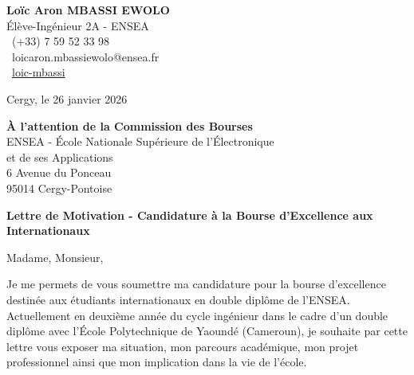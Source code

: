 \documentclass[a4paper,11pt]{article}
\begin{document}
\begin{flushleft}
\textbf{Loïc Aron MBASSI EWOLO} \\
Élève-Ingénieur 2A - ENSEA \\
\faPhone\ (+33) 7 59 52 33 98 \\
\faEnvelope\ loicaron.mbassiewolo@ensea.fr \\
\faLinkedin\ \href{https://www.linkedin.com/in/loic-aron-mbassi-ewolo-3942a9246/}{loic-mbassi} \\
\end{flushleft}

\vspace{0.5cm}

\begin{flushright}
Cergy, le 26 janvier 2026
\end{flushright}

\vspace{0.5cm}

\begin{flushleft}
\textbf{À l'attention de la Commission des Bourses} \\
ENSEA - École Nationale Supérieure de l'Électronique \\
et de ses Applications \\
6 Avenue du Ponceau \\
95014 Cergy-Pontoise
\end{flushleft}

\vspace{0.8cm}

\begin{center}
\textbf{\large Lettre de Motivation - Candidature à la Bourse d'Excellence aux Internationaux}
\end{center}

\vspace{0.5cm}

\onehalfspacing

Madame, Monsieur,

\vspace{0.3cm}

Je me permets de vous soumettre ma candidature pour la bourse d'excellence destinée aux étudiants internationaux en double diplôme de l'ENSEA. Actuellement en deuxième année du cycle ingénieur dans le cadre d'un double diplôme avec l'École Polytechnique de Yaoundé (Cameroun), je souhaite par cette lettre vous exposer ma situation, mon parcours académique, mon projet professionnel ainsi que mon implication dans la vie de l'école.
\end{document}
